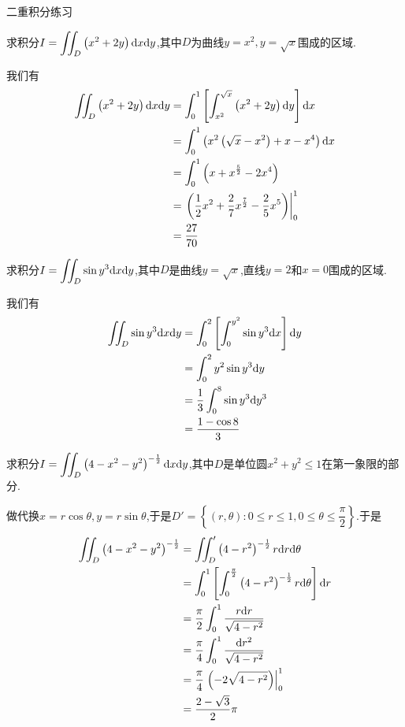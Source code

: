 \documentclass{ctexart}
\begin{document}
\pagestyle{empty}
\begin{center}\large 二重积分练习\end{center}
\begin{problem}[1.]
    求积分$\displaystyle I=\iint_D\left(x^2+2y\right)\mathrm{d} x\mathrm{d} y$,其中$D$为曲线$y=x^2,y=\sqrt{x}$围成的区域.
\end{problem}
\begin{solution}
    我们有
    \[\begin{aligned}
        \iint_D\left(x^2+2y\right)\mathrm{d} x\mathrm{d} y
        &= \int_0^1\left[\int_{x^2}^{\sqrt{x}}\left(x^2+2y\right)\mathrm{d} y\right]\mathrm{d} x \\
        &= \int_0^1\left(x^2\left(\sqrt{x}-x^2\right)+x-x^4\right)\mathrm{d} x \\
        &= \int_0^1\left(x+x^{\frac52}-2x^4\right) \\
        &= \left.\left(\dfrac12x^2+\dfrac27x^{\frac72}-\dfrac25x^5\right)\right|_0^1 \\
        &= \dfrac{27}{70}
    \end{aligned}\]
\end{solution}
\begin{problem}[2.]
    求积分$\displaystyle I=\iint_D\sin y^3\mathrm{d} x\mathrm{d} y$,其中$D$是曲线$y=\sqrt x$,直线$y=2$和$x=0$围成的区域.
\end{problem}
\begin{solution}
    我们有
    \[\begin{aligned}
        \iint_D\sin y^3\mathrm{d} x\mathrm{d} y
        &= \int_0^2\left[\int_0^{y^2}\sin y^3\mathrm{d} x\right]\mathrm{d} y \\
        &= \int_0^2y^2\sin y^3\mathrm{d} y \\
        &= \dfrac13\int_0^8 \sin y^3\mathrm{d} y^3 \\
        &= \dfrac{1-\cos 8}{3}
    \end{aligned}\]
\end{solution}
\begin{problem}[3.]
    求积分$\displaystyle I=\iint_D\left(4-x^2-y^2\right)^{-\frac12}\mathrm{d} x\mathrm{d} y$,其中$D$是单位圆$x^2+y^2\leqslant1$在第一象限的部分.
\end{problem}
\begin{solution}
    做代换$x=r\cos\theta,y=r\sin\theta$,于是$D'=\left\{(r,\theta):0\leqslant r\leqslant 1,0\leqslant\theta\leqslant\dfrac\pi2\right\}$.于是
    \[\begin{aligned}
        \iint_D\left(4-x^2-y^2\right)^{-\frac{1}{2}}
        &= \iint_D'\left(4-r^2\right)^{-\frac12}r\mathrm{d} r\mathrm{d}\theta \\
        &= \int_0^1\left[\int_0^{\frac\pi2}\left(4-r^2\right)^{-\frac12}r\mathrm{d}\theta\right]\mathrm{d} r \\
        &= \dfrac\pi2\int_0^1\dfrac{r\mathrm{d} r}{\sqrt{4-r^2}} \\
        &= \dfrac\pi4\int_0^1\dfrac{\mathrm{d} r^2}{\sqrt{4-r^2}} \\
        &= \dfrac\pi4\left.\left(-2\sqrt{4-r^2}\right)\right|_0^1 \\
        &= \dfrac{2-\sqrt3}{2}\pi
    \end{aligned}\]
\end{solution}
\end{document}
